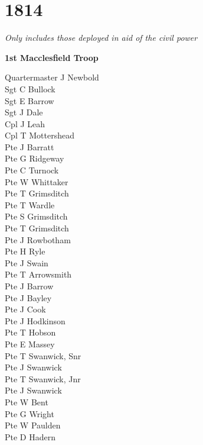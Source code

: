 \chapter*{1814}

\begin{center}
  \textit{Only includes those deployed in aid of the civil power}
\end{center}

\begin{center}
  \Large
  \textbf{1st Macclesfield Troop}
\end{center}

\begin{multicols}{2}
  \noindent
  Quartermaster J Newbold \\
  Sgt C Bullock \\
  Sgt E Barrow \\
  Sgt J Dale \\
  Cpl J Leah \\
  Cpl T Mottershead \\
  Pte J Barratt \\
  Pte G Ridgeway \\
  Pte C Turnock \\
  Pte W Whittaker \\
  Pte T Grimsditch \\
  Pte T Wardle \\
  Pte S Grimsditch \\
  Pte T Grimsditch \\
  Pte J Rowbotham \\
  Pte H Ryle \\
  Pte J Swain \\
  Pte T Arrowsmith \\
  Pte J Barrow \\
  Pte J Bayley \\
  Pte J Cook \\
  Pte J Hodkinson \\
  Pte T Hobson \\
  Pte E Massey \\
  Pte T Swanwick, Snr \\
  Pte J Swanwick \\
  Pte T Swanwick, Jnr \\
  Pte J Swanwick \\
  Pte W Bent \\
  Pte G Wright \\
  Pte W Paulden \\
  Pte D Hadern \\

\end{multicols}
